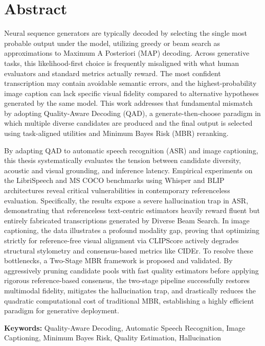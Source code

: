 
\section*{Abstract}

Neural sequence generators are typically decoded by selecting the single most probable output under the model, utilizing greedy or beam search as approximations to Maximum A Posteriori (MAP) decoding. Across generative tasks, this likelihood-first choice is frequently misaligned with what human evaluators and standard metrics actually reward. The most confident transcription may contain avoidable semantic errors, and the highest-probability image caption can lack specific visual fidelity compared to alternative hypotheses generated by the same model. This work addresses that fundamental mismatch by adopting Quality-Aware Decoding (QAD), a generate-then-choose paradigm in which multiple diverse candidates are produced and the final output is selected using task-aligned utilities and Minimum Bayes Risk (MBR) reranking.

By adapting QAD to automatic speech recognition (ASR) and image captioning, this thesis systematically evaluates the tension between candidate diversity, acoustic and visual grounding, and inference latency. Empirical experiments on the LibriSpeech and MS COCO benchmarks using Whisper and BLIP architectures reveal critical vulnerabilities in contemporary referenceless evaluation. Specifically, the results expose a severe hallucination trap in ASR, demonstrating that referenceless text-centric estimators heavily reward fluent but entirely fabricated transcriptions generated by Diverse Beam Search. In image captioning, the data illustrates a profound modality gap, proving that optimizing strictly for reference-free visual alignment via CLIPScore actively degrades structural stylometry and consensus-based metrics like CIDEr. To resolve these bottlenecks, a Two-Stage MBR framework is proposed and validated. By aggressively pruning candidate pools with fast quality estimators before applying rigorous reference-based consensus, the two-stage pipeline successfully restores multimodal fidelity, mitigates the hallucination trap, and drastically reduces the quadratic computational cost of traditional MBR, establishing a highly efficient paradigm for generative deployment.

\vfill
\textbf{\Large Keywords:} Quality-Aware Decoding, Automatic Speech Recognition, Image Captioning, Minimum Bayes Risk, Quality Estimation, Hallucination

